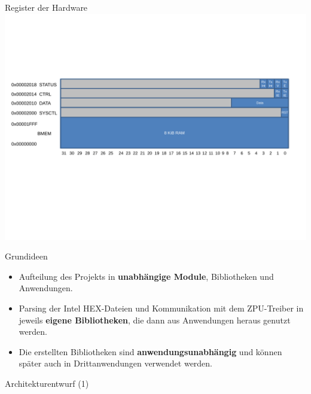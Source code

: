 \documentclass[10pt]{beamer}
\begin{document}
	\begin{frame}{Register der Hardware}
		\includegraphics[width=\textwidth,clip=true,trim=0.5cm 7cm 0.5cm 5cm]{images/raggedstone1_ZPU.pdf}
	\end{frame}
	
	\begin{frame}{Grundideen}
		\begin{itemize}
			\item Aufteilung des Projekts in \textbf{unabhängige Module}, Bibliotheken und Anwendungen.
			\item Parsing der Intel HEX-Dateien und Kommunikation mit dem ZPU-Treiber in jeweils \textbf{eigene Bibliotheken}, die dann aus Anwendungen heraus genutzt werden.
			\item Die erstellten Bibliotheken sind \textbf{anwendungsunabhängig} und können später auch in Drittanwendungen verwendet werden.
		\end{itemize}
	\end{frame}

	\begin{frame}{Architekturentwurf (1)}
	\begin{center}
		
	\end{center}
	\end{frame}
	
\end{document}
